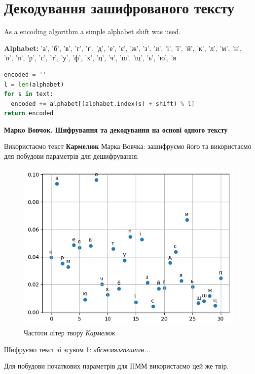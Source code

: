 \documentclass[12pt,a4paper]{article}
\begin{document}
  \clearpage


  \section{Декодування зашифрованого тексту}

  As a encoding algorithm a simple alphabet shift was used.

  \textbf{Alphabet:} 'а', 'б', 'в', 'г', 'ґ', 'д', 'е', 'є', 'ж', 'з', 'и', 'і', 'ї', 'й', 'к', 'л', 'м', 'н', 'о', 'п', 'р', 'с', 'т', 'у', 'ф', 'х', 'ц', 'ч', 'ш', 'щ', 'ь', 'ю', 'я

  \begin{lstlisting}[language=Python]
encoded = ''
l = len(alphabet)
for s in text:
  encoded += alphabet[(alphabet.index(s) + shift) % l]
return encoded
  \end{lstlisting}

  \textbf{Марко Вовчок. Шифрування та декодування на основі одного тексту}

  Використаємо текст \textbf{Кармелюк} Марка Вовчка: зашифруємо його та
  використаємо для побудови параметрів для дешифрування.


  \begin{figure}[h]
    \includegraphics[width=12cm]{../text_frequencies/karmeluk.png}
    \centering
    \caption{Частоти літер твору \textit{Кармелюк}}
  \end{figure}

  Шифруємо текст зі зсувом 1:
  \textit{лбснємялгпгшплн...}

  Для побудови початкових параметрів для ПММ використаємо цей же твір.
\end{document}
